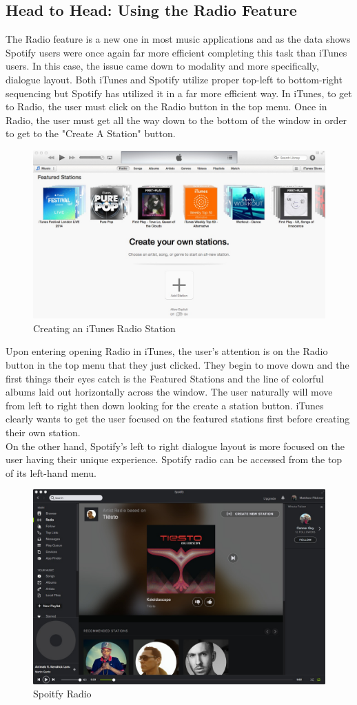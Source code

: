 \documentclass[a4paper]{article}
\begin{document}
\subsection{Head to Head: Using the Radio Feature}
The Radio feature is a new one in most music applications and as the data shows Spotify users were once again far more efficient completing this task than iTunes users. In this case, the issue came down to modality and more specifically, dialogue layout. Both iTunes and Spotify utilize proper top-left to bottom-right sequencing but Spotify has utilized it in a far more efficient way.
In iTunes, to get to Radio, the user must click on the Radio button in the top menu. Once in Radio, the user must get all the way down to the bottom of the window in order to get to the "Create A Station" button.

\begin{figure}[H]
\centering
\includegraphics[width=.6\textwidth]{itunesradio.jpg}
\caption{\label{heuristic: iTunesRadio} Creating an iTunes Radio Station}
\end{figure}

Upon entering opening Radio in iTunes, the user's attention is on the Radio button in the top menu that they just clicked. They begin to move down and the first things their eyes catch is the Featured Stations and the line of colorful albums laid out horizontally across the window. The user naturally will move from left to right then down looking for the create a station button. iTunes clearly wants to get the user focused on the featured stations first before creating their own station.\\

On the other hand, Spotify's left to right dialogue layout is more focused on the user having their unique experience. Spotify radio can be accessed from the top of its left-hand menu.

\begin{figure}[H]
\centering
\includegraphics[width=.6\textwidth]{spotifyradio.jpg}
\caption{\label{heuristic: spotifyRadio} Spoitfy Radio}
\end{figure}
\end{document}
